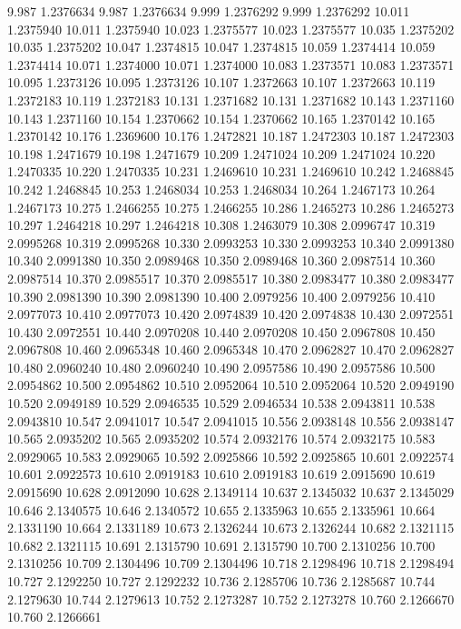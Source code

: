 9.987 1.2376634
9.987 1.2376634
9.999 1.2376292
9.999 1.2376292
10.011 1.2375940
10.011 1.2375940
10.023 1.2375577
10.023 1.2375577
10.035 1.2375202
10.035 1.2375202
10.047 1.2374815
10.047 1.2374815
10.059 1.2374414
10.059 1.2374414
10.071 1.2374000
10.071 1.2374000
10.083 1.2373571
10.083 1.2373571
10.095 1.2373126
10.095 1.2373126
10.107 1.2372663
10.107 1.2372663
10.119 1.2372183
10.119 1.2372183
10.131 1.2371682
10.131 1.2371682
10.143 1.2371160
10.143 1.2371160
10.154 1.2370662
10.154 1.2370662
10.165 1.2370142
10.165 1.2370142
10.176 1.2369600
10.176 1.2472821
10.187 1.2472303
10.187 1.2472303
10.198 1.2471679
10.198 1.2471679
10.209 1.2471024
10.209 1.2471024
10.220 1.2470335
10.220 1.2470335
10.231 1.2469610
10.231 1.2469610
10.242 1.2468845
10.242 1.2468845
10.253 1.2468034
10.253 1.2468034
10.264 1.2467173
10.264 1.2467173
10.275 1.2466255
10.275 1.2466255
10.286 1.2465273
10.286 1.2465273
10.297 1.2464218
10.297 1.2464218
10.308 1.2463079
10.308 2.0996747
10.319 2.0995268
10.319 2.0995268
10.330 2.0993253
10.330 2.0993253
10.340 2.0991380
10.340 2.0991380
10.350 2.0989468
10.350 2.0989468
10.360 2.0987514
10.360 2.0987514
10.370 2.0985517
10.370 2.0985517
10.380 2.0983477
10.380 2.0983477
10.390 2.0981390
10.390 2.0981390
10.400 2.0979256
10.400 2.0979256
10.410 2.0977073
10.410 2.0977073
10.420 2.0974839
10.420 2.0974838
10.430 2.0972551
10.430 2.0972551
10.440 2.0970208
10.440 2.0970208
10.450 2.0967808
10.450 2.0967808
10.460 2.0965348
10.460 2.0965348
10.470 2.0962827
10.470 2.0962827
10.480 2.0960240
10.480 2.0960240
10.490 2.0957586
10.490 2.0957586
10.500 2.0954862
10.500 2.0954862
10.510 2.0952064
10.510 2.0952064
10.520 2.0949190
10.520 2.0949189
10.529 2.0946535
10.529 2.0946534
10.538 2.0943811
10.538 2.0943810
10.547 2.0941017
10.547 2.0941015
10.556 2.0938148
10.556 2.0938147
10.565 2.0935202
10.565 2.0935202
10.574 2.0932176
10.574 2.0932175
10.583 2.0929065
10.583 2.0929065
10.592 2.0925866
10.592 2.0925865
10.601 2.0922574
10.601 2.0922573
10.610 2.0919183
10.610 2.0919183
10.619 2.0915690
10.619 2.0915690
10.628 2.0912090
10.628 2.1349114
10.637 2.1345032
10.637 2.1345029
10.646 2.1340575
10.646 2.1340572
10.655 2.1335963
10.655 2.1335961
10.664 2.1331190
10.664 2.1331189
10.673 2.1326244
10.673 2.1326244
10.682 2.1321115
10.682 2.1321115
10.691 2.1315790
10.691 2.1315790
10.700 2.1310256
10.700 2.1310256
10.709 2.1304496
10.709 2.1304496
10.718 2.1298496
10.718 2.1298494
10.727 2.1292250
10.727 2.1292232
10.736 2.1285706
10.736 2.1285687
10.744 2.1279630
10.744 2.1279613
10.752 2.1273287
10.752 2.1273278
10.760 2.1266670
10.760 2.1266661
